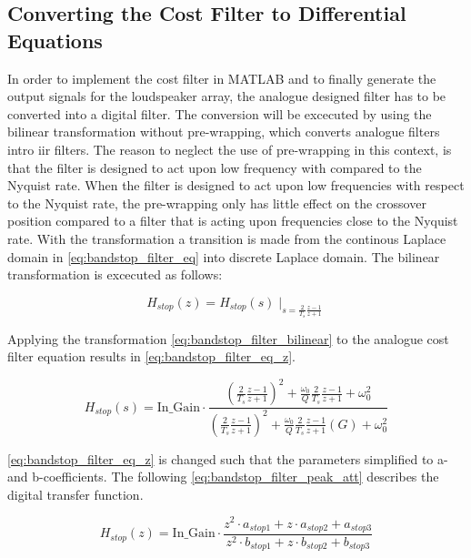 \subsection{Converting the Cost Filter to Differential Equations}
In order to implement the cost filter in MATLAB and to finally generate the output signals for the loudspeaker array, the analogue designed filter has to be converted into a digital filter. The conversion will be excecuted by using the bilinear transformation without pre-wrapping, which converts analogue filters intro \gls{iir} filters. The reason to neglect the use of pre-wrapping in this context, is that the filter is designed to act upon low frequency with compared to the Nyquist rate. When the filter is designed to act upon low frequencies with respect to the Nyquist rate, the pre-wrapping only has little effect on the crossover position compared to a filter that is acting upon frequencies close to the Nyquist rate. With the transformation a transition is made from the continous Laplace domain in \autoref{eq:bandstop_filter_eq} into discrete Laplace domain. The bilinear transformation is excecuted as follows:

\begin{equation}\label{eq:bandstop_filter_bilinear}
H_{stop}(z) = H_{stop}(s) \mid_{s=\frac{2}{T_s}\frac{z-1}{z+1}} 
\end{equation}

    \startexplain
    \stopexplain

Applying the transformation \autoref{eq:bandstop_filter_bilinear} to the analogue cost filter equation results in \autoref{eq:bandstop_filter_eq_z}.

\begin{equation}\label{eq:bandstop_filter_eq_z}
H_{stop}(s) = \text{In_Gain} \cdot \frac{(\frac{2}{T_s}\frac{z-1}{z+1})^2+\frac{\omega_0}{Q}\frac{2}{T_s}\frac{z-1}{z+1}+\omega_0^2}{(\frac{2}{T_s}\frac{z-1}{z+1})^2+\frac{\omega_0}{Q}\frac{2}{T_s}\frac{z-1}{z+1}(G)+\omega_0^2}
\end{equation}

\autoref{eq:bandstop_filter_eq_z} is changed such that the parameters simplified to a- and b-coefficients. The following \autoref{eq:bandstop_filter_peak_att} describes the digital transfer function.


\begin{equation}\label{eq:bandstop_filter_peak_att}
        H_{stop}(z) =  \text{In_Gain} \cdot \frac{z^2 \cdot a_{stop1} + z \cdot a_{stop2} + a_{stop3}}{z^2 \cdot b_{stop1} + z \cdot b_{stop2} + b_{stop3}}
    \end{equation}
    
